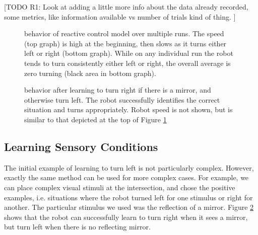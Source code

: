 \documentclass[conference]{IEEEtran}
\begin{document}
[TODO R1: Look at adding a little more info about the data already recorded, some metrics, like information available vs number of trials kind of thing. ]

\begin{figure}[!t]
\centering
\caption{behavior of reactive control model over multiple runs. The speed (top graph) is high at the beginning, then slows as it turns either left or right (bottom graph). While on any individual run the robot tends to turn consistently either left or right, the overall average is zero turning (black area in bottom graph).}
\label{Cnt}
\end{figure}


\begin{figure}[!t]
\centering
\caption{behavior after learning to turn right if there is a mirror, and otherwise turn left. The robot successfully identifies the correct situation and turns appropriately. Robot speed is not shown, but is similar to that depicted at the top of Figure \ref{Cnt}}
\label{Right}
\end{figure}

\subsection{Learning Sensory Conditions}

The initial example of learning to turn left is not particularly complex. However, exactly the same method can be used for more complex cases. For example, we can place complex visual stimuli at the intersection, and chose the positive examples, i.e. situations where the robot turned left for one stimulus or right for another. The particular stimulus we used was the reflection of a mirror. Figure \ref{Right} shows that the robot can successfully learn to turn right when it sees a mirror, but turn left when there is no reflecting mirror. 
\end{document}
